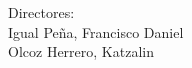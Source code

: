 {\raggedleft
Directores:\\
   \vspace{ 1cm}
Igual Peña, Francisco Daniel\\
Olcoz Herrero, Katzalin\\
}



